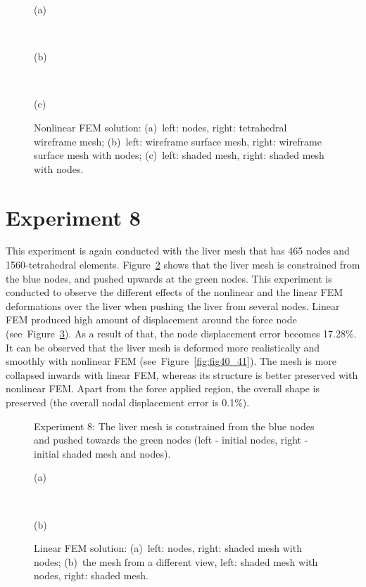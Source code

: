 \begin{figure}[h]
\centerline{}
\centerline{(a)}
\centerline{\ }
\centerline{}
\centerline{(b)}
\centerline{\ }
\centerline{}
\centerline{(c)}
\caption{Nonlinear FEM solution: (a)~left: nodes, right: tetrahedral wireframe mesh;
                                 (b)~left: wireframe surface mesh, right: wireframe surface mesh with nodes;
                                 (c)~left: shaded mesh, right: shaded mesh with nodes.}
\label{fig:fig34_35_36}
\end{figure}

\clearpage
\section{Experiment 8}
\label{viii}
This experiment is again conducted with the liver mesh that has 465 nodes and 1560-tetrahedral elements. Figure~\ref{fig:fig37} shows that the liver mesh is constrained from the blue nodes, and pushed upwards at the green nodes. This experiment is conducted to observe the different effects of the nonlinear and the linear FEM deformations over the liver when pushing the liver from several nodes. Linear FEM produced high amount of displacement around the force node (see~Figure~\ref{fig:fig38_39}). As a result of that, the node displacement error becomes 17.28\%. It can be observed that the liver mesh is deformed more realistically and smoothly with nonlinear FEM (see~Figure~\ref{fig:fig40_41}). The mesh is more collapsed inwards with linear FEM, whereas its structure is better preserved with nonlinear FEM. Apart from the force applied region, the overall shape is preserved (the overall nodal displacement error is 0.1\%).


\begin{figure}[h]
\centerline{}
\caption{Experiment 8: The liver mesh is constrained from the blue nodes and pushed towards the green nodes (left - initial nodes, right - initial shaded mesh and nodes).}
\label{fig:fig37}
\end{figure}

\begin{figure}[h]
\centerline{}
\centerline{(a)}
\centerline{\ }
\centerline{}
\centerline{(b)}
\caption{Linear FEM solution: (a)~left: nodes, right: shaded mesh with nodes; (b)~the mesh from a different view, left: shaded mesh with nodes, right: shaded mesh.}
\label{fig:fig38_39}
\end{figure}

